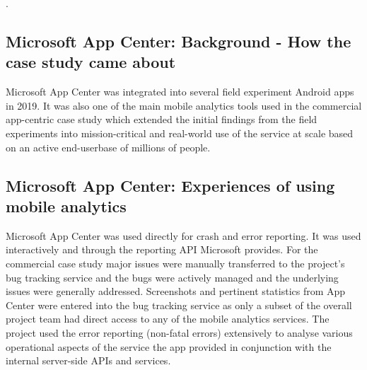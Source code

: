 .

\subsection{Microsoft App Center: Background - How the case study came about}
Microsoft App Center was integrated into several field experiment Android apps in 2019. It was also one of the main mobile analytics tools used in the commercial app-centric case study which extended the initial findings from the field experiments into mission-critical and real-world use of the service at scale based on an active end-userbase of millions of people.

\subsection{Microsoft App Center: Experiences of using mobile analytics}
Microsoft App Center was used directly for crash and error reporting. It was used interactively and through the reporting API Microsoft provides. For the commercial case study major issues were manually transferred to the project's bug tracking service and the bugs were actively managed and the underlying issues were generally addressed. Screenshots and pertinent statistics from App Center were entered into the bug tracking service as only a subset of the overall project team had direct access to any of the mobile analytics services. The project used the error reporting (non-fatal errors) extensively to analyse various operational aspects of the service the app provided in conjunction with the internal server-side APIs and services.

